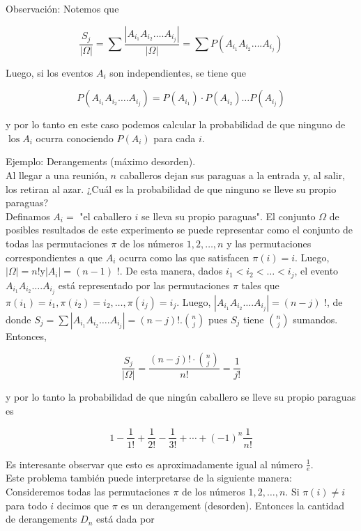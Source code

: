 \documentclass[10pt]{article}
\begin{document}
Observación: Notemos que

$$
\frac{S_{j}}{|\Omega|}=\sum \frac{\left|A_{i_{1}} A_{i_{2}} \ldots . A_{i_{j}}\right|}{|\Omega|}=\sum P\left(A_{i_{1}} A_{i_{2}} \ldots . A_{i_{j}}\right)
$$

Luego, si los eventos $A_{i}$ son independientes, se tiene que

$$
P\left(A_{i_{1}} A_{i_{2}} \ldots . A_{i_{j}}\right)=P\left(A_{i_{1}}\right) \cdot P\left(A_{i_{2}}\right) \ldots P\left(A_{i_{j}}\right)
$$

y por lo tanto en este caso podemos calcular la probabilidad de que ninguno de $\operatorname{los} A_{i}$ ocurra conociendo $P\left(A_{i}\right)$ para cada $i$.

Ejemplo: Derangements (máximo desorden).\\
Al llegar a una reunión, $n$ caballeros dejan sus paraguas a la entrada y, al salir, los retiran al azar. ¿Cuál es la probabilidad de que ninguno se lleve su propio paraguas?\\
Definamos $A_{i}=$ "el caballero $i$ se lleva su propio paraguas". El conjunto $\Omega$ de posibles resultados de este experimento se puede representar como el conjunto de todas las permutaciones $\pi$ de los números $1,2, \ldots, n$ y las permutaciones correspondientes a que $A_{i}$ ocurra como las que satisfacen $\pi(i)=i$. Luego, $|\Omega|=n!\mathrm{y}\left|A_{i}\right|=(n-1)$ !. De esta manera, dados $i_{1}<i_{2}<\ldots<i_{j}$, el evento $A_{i_{1}} A_{i_{2}} \ldots . A_{i_{j}}$ está representado por las permutaciones $\pi$ tales que $\pi\left(i_{1}\right)=i_{1}, \pi\left(i_{2}\right)=i_{2}, \ldots, \pi\left(i_{j}\right)=i_{j}$. Luego, $\left|A_{i_{1}} A_{i_{2}} \ldots . A_{i_{j}}\right|=(n-j)$ !, de donde $S_{j}=\sum\left|A_{i_{1}} A_{i_{2}} \ldots . A_{i_{j}}\right|=(n-j)!.\binom{n}{j}$ pues $S_{j}$ tiene $\binom{n}{j}$ sumandos.\\
Entonces,

$$
\frac{S_{j}}{|\Omega|}=\frac{(n-j)!\cdot\binom{n}{j}}{n!}=\frac{1}{j!}
$$

y por lo tanto la probabilidad de que ningún caballero se lleve su propio paraguas es

$$
1-\frac{1}{1!}+\frac{1}{2!}-\frac{1}{3!}+\cdots+(-1)^{n} \frac{1}{n!}
$$

Es interesante observar que esto es aproximadamente igual al número $\frac{1}{e}$.\\
Este problema también puede interpretarse de la siguiente manera:\\
Consideremos todas las permutaciones $\pi$ de los números $1,2, \ldots, n$. Si $\pi(i) \neq i$ para todo $i$ decimos que $\pi$ es un derangement (desorden). Entonces la cantidad de derangements $D_{n}$ está dada por
\end{document}
